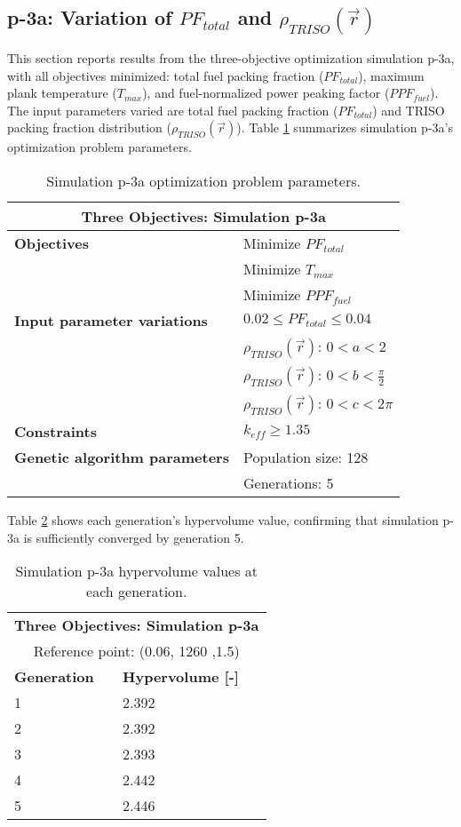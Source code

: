 \subsection{p-3a: Variation of $PF_{total}$ and $\rho_{TRISO}(\vec{r})$}
\label{sec:p-3a}
This section reports results from the three-objective optimization simulation p-3a, 
with all objectives minimized: total fuel packing fraction ($PF_{total}$), 
maximum plank temperature ($T_{max}$), and fuel-normalized power peaking factor 
($PPF_{fuel}$).  
The input parameters varied are total fuel packing fraction ($PF_{total}$) and 
TRISO packing fraction distribution ($\rho_{TRISO}(\vec{r})$). 
Table \ref{tab:simulationp3a} summarizes simulation p-3a's optimization problem parameters. 
\begin{table}[htbp!]
    \centering
    \onehalfspacing
    \caption{Simulation p-3a optimization problem parameters.}
	\label{tab:simulationp3a}
    \footnotesize
    \begin{tabular}{l|p{4cm}}
    \hline 
    \multicolumn{2}{c}{\textbf{Three Objectives: Simulation p-3a}} \\
    \hline 
    \textbf{Objectives} & Minimize $PF_{total}$ \\
    & Minimize $T_{max}$ \\
    & Minimize $PPF_{fuel}$ \\
    \hline 
    \textbf{Input parameter variations} & $0.02 \leq PF_{total} \leq 0.04$ \\
    & $\rho_{TRISO}(\vec{r})$: $0<a<2$ \\
    & $\rho_{TRISO}(\vec{r})$: $0<b<\frac{\pi}{2}$ \\
    & $\rho_{TRISO}(\vec{r})$: $0<c<2\pi$ \\
    \hline
    \textbf{Constraints} & $k_{eff} \geq 1.35$\\ 
    \hline 
    \textbf{Genetic algorithm parameters} & Population size: 128 \\
    & Generations: 5 \\
    \hline
    \end{tabular}
\end{table}
Table \ref{tab:p3a-hypervolume} shows each generation's hypervolume value, 
confirming that simulation p-3a is sufficiently converged by generation 5. 
\begin{table}[htbp!]
    \centering
    \onehalfspacing
    \caption{Simulation p-3a hypervolume values at each generation.}
	\label{tab:p3a-hypervolume}
    \footnotesize
    \begin{tabular}{ll}
    \hline 
    \multicolumn{2}{c}{\textbf{Three Objectives: Simulation p-3a}} \\
    \multicolumn{2}{c}{Reference point: (0.06, 1260 ,1.5)} \\
    \hline 
    \textbf{Generation} & \textbf{Hypervolume [-]} \\
    \hline
    1 & 2.392 \\
    2 & 2.392 \\
    3 & 2.393 \\
    4 & 2.442 \\
    5 & 2.446 \\
    \hline
    \end{tabular}
\end{table}

